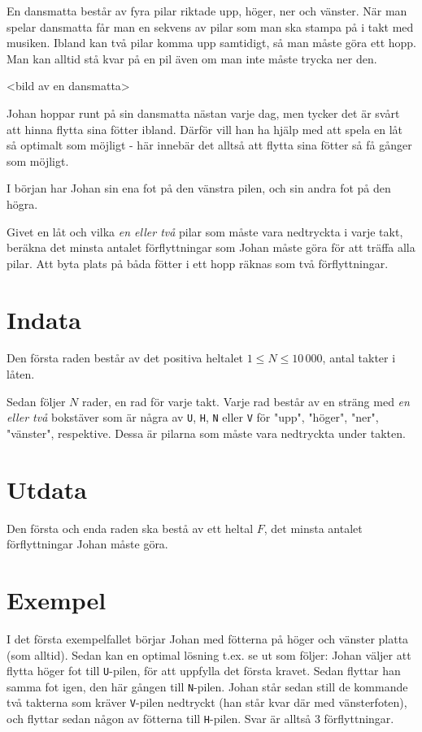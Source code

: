 En dansmatta består av fyra pilar riktade upp, höger, ner och vänster. När man spelar dansmatta får man en sekvens av pilar som man ska stampa på i takt med musiken. Ibland kan två pilar komma upp samtidigt, så man måste göra ett hopp. Man kan alltid stå kvar på en pil även om man inte måste trycka ner den.

<bild av en dansmatta>

Johan hoppar runt på sin dansmatta nästan varje dag, men tycker det är svårt att hinna flytta sina fötter ibland. Därför vill han ha hjälp med att spela en låt så optimalt som möjligt - här innebär det alltså att flytta sina fötter så få gånger som möjligt.

I början har Johan sin ena fot på den vänstra pilen, och sin andra fot på den högra.

Givet en låt och vilka \emph{en eller två} pilar som måste vara nedtryckta i varje takt, beräkna det minsta antalet förflyttningar som Johan måste göra för att träffa alla pilar. Att byta plats på båda fötter i ett hopp räknas som två förflyttningar.


\section*{Indata}
Den första raden består av det positiva heltalet $1 \le N \le 10\,000$, antal takter i låten.

Sedan följer $N$ rader, en rad för varje takt. Varje rad består av en sträng med \emph{en eller två} bokstäver som är några av \texttt{U}, \texttt{H}, \texttt{N} eller \texttt{V} för "upp", "höger", "ner", "vänster", respektive. Dessa är pilarna som måste vara nedtryckta under takten.

\section*{Utdata}
Den första och enda raden ska bestå av ett heltal $F$, det minsta antalet förflyttningar Johan måste göra.

\section*{Exempel}
I det första exempelfallet börjar Johan med fötterna på höger och vänster platta (som alltid). Sedan kan en optimal lösning t.ex. se ut som följer: Johan väljer att flytta höger fot till \texttt{U}-pilen, för att uppfylla det första kravet. Sedan flyttar han samma fot igen, den här gången till \texttt{N}-pilen. Johan står sedan still de kommande två takterna som kräver \texttt{V}-pilen nedtryckt (han står kvar där med vänsterfoten), och flyttar sedan någon av fötterna till \texttt{H}-pilen. Svar är alltså 3 förflyttningar.

